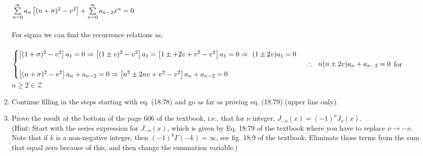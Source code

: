 \documentclass[fleqn]{article}
\begin{document}
\begin{enumerate}
{        \\
        $
          \sum\limits_{n=0}^{\infty}a_n \left[(n+\sigma)^2-v^2\right]+\sum\limits_{n=0}^{\infty} a_{n-2} x^n=0 \\
        $
        \\ 
        \\
        For sigma we can find the recurrence relations as,  \\
        \\
        $
          \begin{cases}
            \left[(1+\sigma)^2-v^2\right]a_1=0 \Rightarrow \left[(1\pm v)^2-v^2\right]a_1=\left[1\pm+2v+v^2-v^2\right]a_1=0 \Rightarrow ~ (1\pm 2v)a_1=0 \\
            \\
            \left[(n+\sigma)^2-v^2\right]a_n+a_{n-2}=0 \Rightarrow \left[n^2 \pm 2nv+v^2-v^2\right]a_n+a_{n-2}=0 \\
          \end{cases} \\
          \\ \\
          \therefore ~~ n(n\pm 2v)a_n+a_{n-2}=0 
        $
         for $n \geq 2 \in \mathcal{Z}$
      }

    \item Continue filling in the steps starting with eq. (18.78) and go as far as proving eq. (18.79) (upper line only). 
    
    
    \item Prove the result at the bottom of the page 606 of the textbook, i.e., that for $\nu$ integer, $J_{-\nu }(x)=(-1)^\nu J_{\nu }(x)$. \\
    (Hint: Start with the series expression for $J_{-\nu }(x)$, which is given by Eq. 18.79 of the textbook where you have to replace $\nu \rightarrow -\nu$. Note that if $k$ is a non-negative integer, then $(-1)^k \Gamma(-k) = \infty$, see fig. 18.9 of the textbook. Eliminate those terms from the sum that equal zero because of this, and then change the summation variable.)
    
  \end{enumerate}
\end{document}
